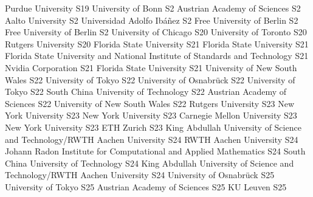 \begin{multicols}{2}
{}
{Purdue University}
{S19}
{}
{University of Bonn}
{S2}
{}
{Austrian Academy of Sciences}
{S2}
{}
{Aalto University}
{S2}
{}
{Universidad Adolfo Ibáñez}
{S2}
{}
{Free University of Berlin}
{S2}
{}
{Free University of Berlin}
{S2}
{}
{University of Chicago}
{S20}
{}
{University of Toronto}
{S20}
{}
{Rutgers University}
{S20}
{}
{Florida State University}
{S21}
{}
{Florida State University}
{S21}
{}
{Florida State University and National Institute of Standards and Technology}
{S21}
{}
{Nvidia Corporation}
{S21}
{}
{Florida State University}
{S21}
{}
{University of New South Wales}
{S22}
{}
{University of Tokyo}
{S22}
{}
{University of Osnabrück}
{S22}
{}
{University of Tokyo}
{S22}
{}
{South China University of Technology}
{S22}
{}
{Austrian Academy of Sciences}
{S22}
{}
{University of New South Wales}
{S22}
{}
{Rutgers University}
{S23}
{}
{New York University}
{S23}
{}
{New York University}
{S23}
{}
{Carnegie Mellon University}
{S23}
{}
{New York University}
{S23}
{}
{ETH Zurich}
{S23}
{}
{King Abdullah University of Science and Technology/RWTH Aachen University}
{S24}
{}
{RWTH Aachen University}
{S24}
{}
{Johann Radon Institute for Computational and Applied Mathematics}
{S24}
{}
{South China University of Technology}
{S24}
{}
{King Abdullah University of Science and Technology/RWTH Aachen University}
{S24}
{}
{University of Osnabrück}
{S25}
{}
{University of Tokyo}
{S25}
{}
{Austrian Academy of Sciences}
{S25}
{}
{KU Leuven}
{S25}
{}

\end{multicols}
